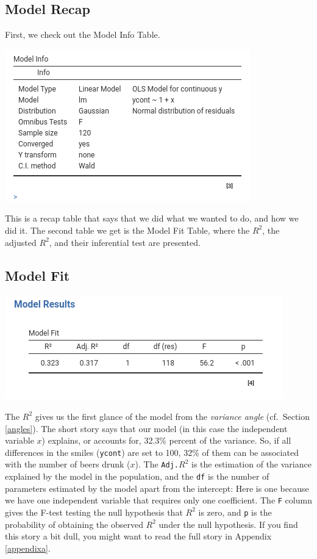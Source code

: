 \documentclass[
]{book}
\begin{document}
\hypertarget{model-recap}{%
\subsection{Model Recap}\label{model-recap}}

First, we check out the {Model Info} Table.

\includegraphics[width=0.7\linewidth]{bookletpics/2_output1}

This is a recap table that says that we did what we wanted to do, and how we did it. The second table we get is the {Model Fit} Table, where the \(R^2\), the adjusted \(R^2\), and their inferential test are presented.

\hypertarget{twofit}{%
\subsection{Model Fit}\label{twofit}}

\includegraphics[width=0.7\linewidth]{bookletpics/2_output2}

The \(R^2\) gives us the first glance of the model from the \emph{variance angle} (cf.~Section \ref{angles}). The short story says that our model (in this case the independent variable \(x\)) explains, or accounts for, 32.3\% percent of the variance. So, if all differences in the smiles (\texttt{ycont}) are set to 100, 32\% of them can be associated with the number of beers drunk (\(x\)). The \texttt{Adj.}\(R^2\) is the estimation of the variance explained by the model in the population, and the \texttt{df} is the number of parameters estimated by the model apart from the intercept: Here is one because we have one independent variable that requires only one coefficient. The \texttt{F} column gives the F-test testing the null hypothesis that \(R^2\) is zero, and \texttt{p} is the probability of obtaining the observed \(R^2\) under the null hypothesis. If you find this story a bit dull, you might want to read the full story in Appendix \ref{appendixa}.
\end{document}
